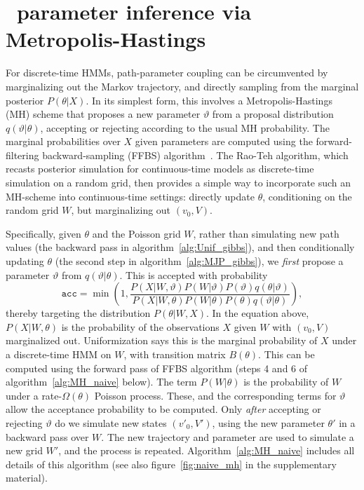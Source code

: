 \vspace{-.2in}
\section{\Naive\ parameter inference via Metropolis-Hastings}
For discrete-time HMMs, path-parameter coupling can be circumvented by marginalizing out the Markov trajectory, and directly sampling from the marginal posterior $P(\theta|X)$.
In its simplest form, this involves a Metropolis-Hastings (MH) scheme that proposes a new parameter $\vartheta$ from a proposal distribution $q(\vartheta|\theta)$, accepting or rejecting according to the usual MH probability.
The marginal probabilities over $X$ given parameters are computed using the forward-filtering backward-sampling (FFBS) algorithm~\citep{fruhwirth1994data,carter1996markov, RaoTeh13}.
The Rao-Teh algorithm, which recasts posterior simulation for continuous-time models as discrete-time simulation on a random grid, then provides a simple way to incorporate such an MH-scheme into continuous-time settings: directly update $\theta$, conditioning on the random grid $W$, but marginalizing out $(v_0, V)$.

Specifically, given $\theta$ and the Poisson grid $W$, rather than simulating new path values (the backward pass in algorithm~\ref{alg:Unif_gibbs}), and then conditionally updating $\theta$ (the second step in algorithm~\ref{alg:MJP_gibbs}), we {\em first} propose a parameter $\vartheta$ from $q(\vartheta|\theta)$. This is accepted with probability 
$$ \texttt{acc} = \min\left(1, 
\frac{P(X|W,\vartheta) P(W|\vartheta)P(\vartheta)q(\theta|\vartheta)} {P(X|W,\theta) P(W|\theta)P(\theta)q(\vartheta|\theta)}\right),$$ 
thereby targeting the distribution $P(\theta|W,X)$.
In the equation above, $P(X|W,\theta)$ is the probability of the observations $X$ given $W$ with $(v_0,V)$ marginalized out. 
Uniformization says this is the marginal probability of $X$ under a discrete-time HMM on $W$, with transition matrix $B(\theta)$. This can be computed using the forward pass of FFBS algorithm (steps 4 and 6 of algorithm~\ref{alg:MH_naive} below). 
The term $P(W|\theta)$ is the probability of $W$ under a rate-$\Omega(\theta)$ Poisson process. 
These, and the corresponding terms for $\vartheta$ allow the acceptance probability to be computed.
Only {\em after} accepting or rejecting $\vartheta$ do we simulate new states $(v'_0,V')$, using the new parameter $\theta'$ in a backward pass over $W$. 
The new trajectory and parameter are used to simulate a new grid $W'$, and the process is repeated.
Algorithm~\ref{alg:MH_naive} includes all details of this algorithm (see also figure~\ref{fig:naive_mh} in the supplementary material).

